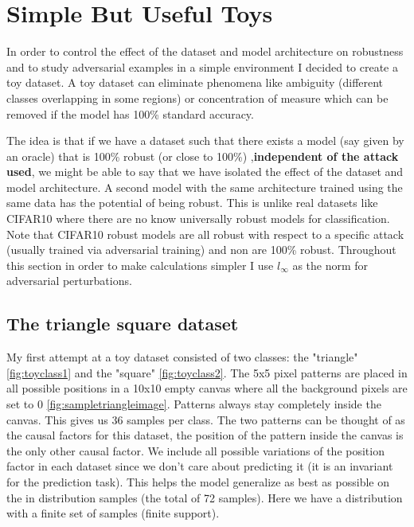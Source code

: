 \documentclass[../thesis.tex]{subfiles}
\begin{document}
\section{Simple But Useful Toys}
\label{sec:toy_datasets}

	In order to control the effect of the dataset and model architecture on robustness and to study adversarial examples in a simple environment I decided to create a toy dataset. A toy dataset can eliminate phenomena like ambiguity (different classes overlapping in some regions) or concentration of measure \cite{concentration_measure} which can be removed if the model has 100\% standard accuracy.
	
	The idea is that if we have a dataset such that there exists a model (say given by an oracle) that is 100\% robust (or close to 100\%) ,\textbf{independent of the attack used}, we might be able to say that we have isolated the effect of the dataset and model architecture. A second model with the same architecture trained using the same data has the potential of being robust. This is unlike real datasets like CIFAR10 where there are no know universally robust models for classification. Note that CIFAR10 robust models are all robust with respect to a specific attack (usually trained via adversarial training) and non are 100\% robust. Throughout this section in order to make calculations simpler I use $l_{\infty}$ as the norm for adversarial perturbations. 
	
	\subsection{The triangle square dataset}
	
	My first attempt at a toy dataset consisted of two classes: the "triangle" \ref{fig:toyclass1} and the "square" \ref{fig:toyclass2}. The 5x5 pixel patterns are placed in all possible positions in a 10x10 empty canvas where all the background pixels are set to 0 \ref{fig:sampletriangleimage}. Patterns always stay completely inside the canvas. This gives us 36 samples per class. The two patterns can be thought of as the causal factors for this dataset, the position of the pattern inside the canvas is the only other causal factor. We include all possible variations of the position factor in each dataset since we don't care about predicting it (it is an invariant for the prediction task). This helps the model generalize as best as possible on the in distribution samples (the total of 72 samples). Here we have a distribution with a finite set of samples (finite support).   
	
\end{document}
